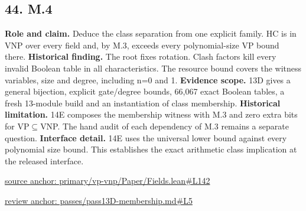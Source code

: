 \documentclass[11pt,letterpaper]{article}
\theoremstyle{definition}\newtheorem{definition}[theorem]{Definition}\newtheorem{example}[theorem]{Example}
\theoremstyle{remark}\newtheorem{remark}[theorem]{Remark}
\begin{document}
\subsection*{44. M.4}
\textbf{Role and claim.} Deduce the class separation from one explicit family. HC is in VNP over every field and, by M.3, exceeds every polynomial-size VP bound there.
\textbf{Historical finding.} The root fixes rotation. Clash factors kill every invalid Boolean table in all characteristics. The resource bound covers the witness variables, size and degree, including n=0 and 1.
\textbf{Evidence scope.} 13D gives a general bijection, explicit gate/degree bounds, 66,067 exact Boolean tables, a fresh 13-module build and an instantiation of class membership.
\textbf{Historical limitation.} 14E composes the membership witness with M.3 and zero extra bits for VP\ensuremath{\subseteq}VNP. The hand audit of each dependency of M.3 remains a separate question.
\textbf{Interface detail.} 14E uses the universal lower bound against every polynomial size bound. This establishes the exact arithmetic class implication at the released interface.
\par\href{https://github.com/nousentllc/VP-VNP-Review/blob/8a7976933b6b2b4ffda1ad3a0dfb5fc6b6f023e8/primary/vp-vnp/Paper/Fields.lean\#L142}{source anchor: primary/vp-vnp/Paper/Fields.lean\#L142}
\par\href{https://github.com/nousentllc/VP-VNP-Review/blob/8a7976933b6b2b4ffda1ad3a0dfb5fc6b6f023e8/passes/pass13D-membership.md\#L5}{review anchor: passes/pass13D-membership.md\#L5}
\goodbreak
{}
\hypertarget{claim.45}{}
\end{document}
